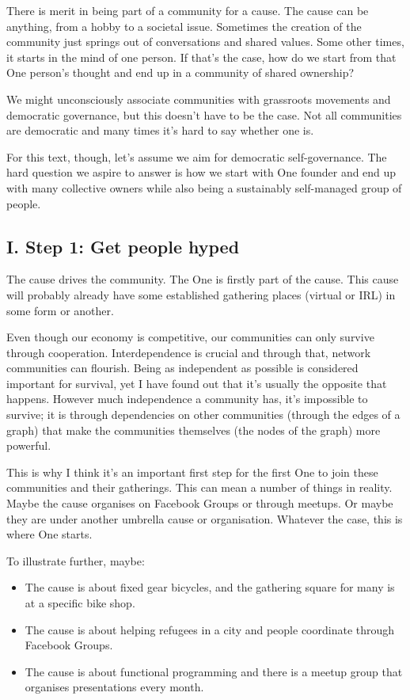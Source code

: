 There is merit in being part of a community for a cause. The cause can be anything, from a hobby to a societal issue. Sometimes the creation of the community just springs out of conversations and shared values. Some other times, it starts in the mind of one person. If that’s the case, how do we start from that One person’s thought and end up in a community of shared ownership?

We might unconsciously associate communities with grassroots movements and democratic governance, but this doesn’t have to be the case. Not all communities are democratic and many times it’s hard to say whether one is.

For this text, though, let’s assume we aim for democratic self-governance. The hard question we aspire to answer is how we start with One founder and end up with many collective owners while also being a sustainably self-managed group of people.

\subsection{I. Step 1: Get people hyped}

The cause drives the community. The One is firstly part of the cause. This cause will probably already have some established gathering places (virtual or IRL) in some form or another.

Even though our economy is competitive, our communities can only survive through cooperation. Interdependence is crucial and through that, network communities can flourish. Being as independent as possible is considered important for survival, yet I have found out that it’s usually the opposite that happens. However much independence a community has, it’s impossible to survive; it is through dependencies on other communities (through the edges of a graph) that make the communities themselves (the nodes of the graph) more powerful.

This is why I think it’s an important first step for the first One to join these communities and their gatherings. This can mean a number of things in reality. Maybe the cause organises on Facebook Groups or through meetups. Or maybe they are under another umbrella cause or organisation. Whatever the case, this is where One starts.

To illustrate further, maybe:

\begin{itemize}
    \item{The cause is about fixed gear bicycles, and the gathering square for many is at a specific bike shop.}
    \item{The cause is about helping refugees in a city and people coordinate through Facebook Groups.}
    \item{The cause is about functional programming and there is a meetup group that organises presentations every month.}
\end{itemize}

